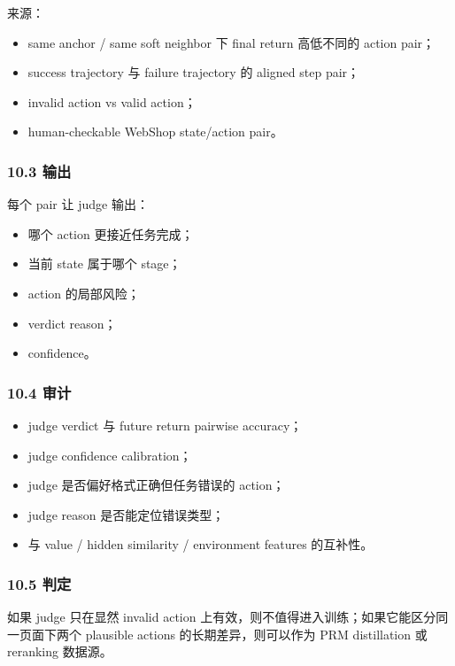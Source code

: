 \documentclass[
  10pt,
]{ctexart}
\providecommand{\tightlist}{%
  \setlength{\itemsep}{0pt}\setlength{\parskip}{0pt}}
\begin{document}
来源：

\begin{itemize}
\tightlist
\item
  same anchor / same soft neighbor 下 final return 高低不同的 action
  pair；
\item
  success trajectory 与 failure trajectory 的 aligned step pair；
\item
  invalid action vs valid action；
\item
  human-checkable WebShop state/action pair。
\end{itemize}

\subsubsection{10.3 输出}\label{ux8f93ux51fa}

每个 pair 让 judge 输出：

\begin{itemize}
\tightlist
\item
  哪个 action 更接近任务完成；
\item
  当前 state 属于哪个 stage；
\item
  action 的局部风险；
\item
  verdict reason；
\item
  confidence。
\end{itemize}

\subsubsection{10.4 审计}\label{ux5ba1ux8ba1-1}

\begin{itemize}
\tightlist
\item
  judge verdict 与 future return pairwise accuracy；
\item
  judge confidence calibration；
\item
  judge 是否偏好格式正确但任务错误的 action；
\item
  judge reason 是否能定位错误类型；
\item
  与 value / hidden similarity / environment features 的互补性。
\end{itemize}

\subsubsection{10.5 判定}\label{ux5224ux5b9a-6}

如果 judge 只在显然 invalid action
上有效，则不值得进入训练；如果它能区分同一页面下两个 plausible actions
的长期差异，则可以作为 PRM distillation 或 reranking 数据源。
\end{document}
